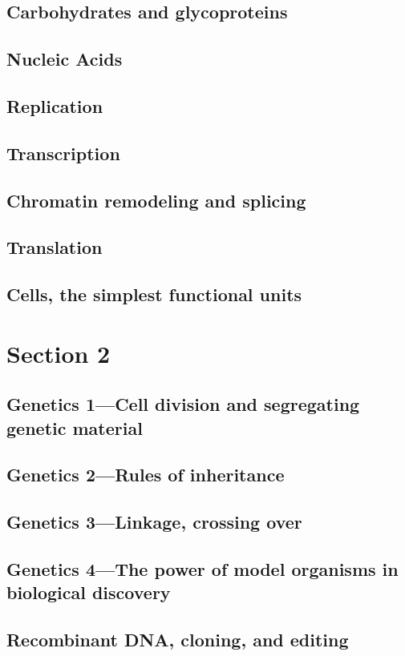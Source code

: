 \documentclass[../introbio.tex]{subfiles}
\begin{document}
\section{Carbohydrates and glycoproteins}
\section{Nucleic Acids}
\section{Replication}
\section{Transcription}
\section{Chromatin remodeling and splicing}
\section{Translation}
\section{Cells, the simplest functional units}
\chapter{Section 2}
\section{Genetics 1—Cell division and segregating genetic material}
\section{Genetics 2—Rules of inheritance}
\section{Genetics 3—Linkage, crossing over}
\section{Genetics 4—The power of model organisms in biological discovery}
\section{Recombinant DNA, cloning, and editing}
\end{document}
